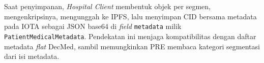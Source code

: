 Saat penyimpanan, \textit{Hospital Client} membentuk objek per segmen, mengenkripsinya, mengunggah ke IPFS, lalu menyimpan CID bersama metadata pada IOTA sebagai JSON base64 di \textit{field} \texttt{metadata} milik \texttt{PatientMedicalMetadata}. Pendekatan ini menjaga kompatibilitas dengan daftar metadata \textit{flat} DecMed, sambil memungkinkan PRE membaca kategori segmentasi dari isi metadata.





